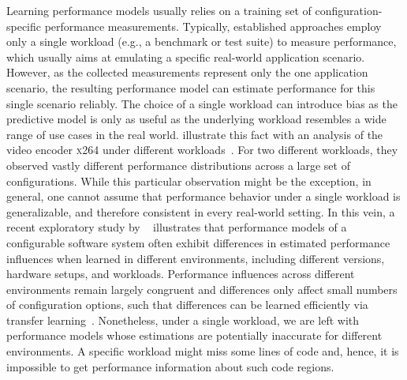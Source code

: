 {\color{olive}
Learning performance models usually relies on a training set of configuration-specific performance measurements. 
Typically, established approaches employ only a single workload (e.g., a benchmark or test suite) to measure performance, which usually aims at emulating a specific real-world application scenario. 
However, as the collected measurements represent only the one application scenario, the resulting performance model can  estimate performance for this single scenario reliably. 
The choice of a single workload can introduce bias as the predictive model is only as useful as the underlying workload resembles a wide range of use cases in the real world. 
\citeauthor{alves_sampling_2020} illustrate this fact with an analysis of the video encoder \textsc{x264} under different workloads~\cite{alves_sampling_2020}. 
For two different workloads, they observed vastly different performance distributions across a large set of configurations.
While this particular observation might be the exception, in general, one cannot assume that performance behavior under a single workload is generalizable, and therefore consistent in every real-world setting.
In this vein, a recent exploratory study by \citeauthor{jamishidi_transfer_2017}~\cite{jamishidi_transfer_2017} illustrates that performance models of a configurable software system often exhibit differences in estimated performance influences when learned in different environments, including different versions, hardware setups, and workloads.
Performance  influences across different environments remain largely congruent and differences only affect small numbers of configuration options, such that differences can be learned efficiently via transfer learning~\cite{jamshidi_transfer_gp_2017,jamshidi_learning_2018}. 
Nonetheless, under a single workload, we are left with performance models whose estimations are potentially inaccurate for different environments. A specific workload might miss some lines of code and, hence, it is impossible to get performance information about such code regions.
}


